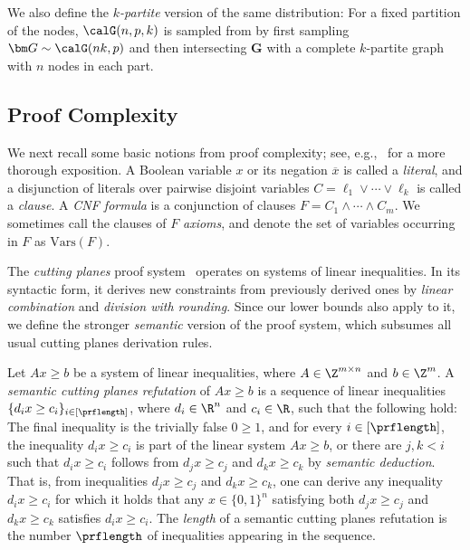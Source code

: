  We also define the \emph{$k$-partite} version of the same distribution: For a fixed partition of the nodes, $\calG(n, p, k)$ is sampled from by first sampling $\bm G \sim \calG(nk, p)$ and then intersecting $\bm G$ with a complete $k$-partite graph with $n$ nodes in each part. 

\subsection{Proof Complexity}
We next recall some basic notions from proof complexity; see, e.g.,~\cite{Krajicek19ProofComplexity,BN21ProofCplxSAT} for a more thorough exposition.  
A Boolean variable $x$ or its negation $\overline{x}$ is called a \emph{literal},
and a disjunction of literals over pairwise disjoint variables $C= \ell_1 \lor \cdots \lor \ell_k$ is called a \emph{clause}.
A \emph{CNF formula} is a conjunction of clauses $F = C_1 \land \cdots \land C_m$. 
We sometimes call the clauses of $F$ \emph{axioms}, and denote the set of variables occurring in $F$ as $\textrm{Vars}(F)$.

The \emph{cutting planes} proof system~\cite{CCT87ComplexityCP} operates on systems of linear inequalities. In its syntactic form, it derives new constraints from previously derived ones by \emph{linear combination} and \emph{division with rounding}. Since our lower bounds also apply to it, we define the stronger \emph{semantic} version of the proof system, which subsumes all usual cutting planes derivation rules. 

Let $Ax\geq b$ be a system of linear inequalities, where $A\in \Z^{m\times n}$ and $b\in \Z^m$.
A \emph{semantic cutting planes refutation} of $Ax\geq b$ is a sequence of linear inequalities 
$\{d_i x\geq c_i\}_{i\in [\prflength]}$, 
where $d_i \in \R^n$ and $c_i\in \R$, such that the following hold: The final inequality is the trivially false $0\geq 1$, and
for every $i \in [\prflength]$, the inequality $d_i x\geq c_i$ is part of the linear system $Ax\geq b$, or there are $j,k<i$ such that $d_i x\geq c_i$ follows from $d_j x\geq c_j$ and $d_k x\geq c_k$ by \emph{semantic deduction}. 
That is, from inequalities $d_j x\geq c_j$ and $d_k x\geq c_k$, one can derive any inequality $d_i x\geq c_i$ for which it holds that any $x \in \{0,1\}^n$ satisfying both $d_j x\geq c_j$ and $d_k x\geq c_k$ satisfies $d_i x\geq c_i$.
The \emph{length} of a semantic cutting planes refutation is the number $\prflength$ of inequalities appearing in the sequence.

